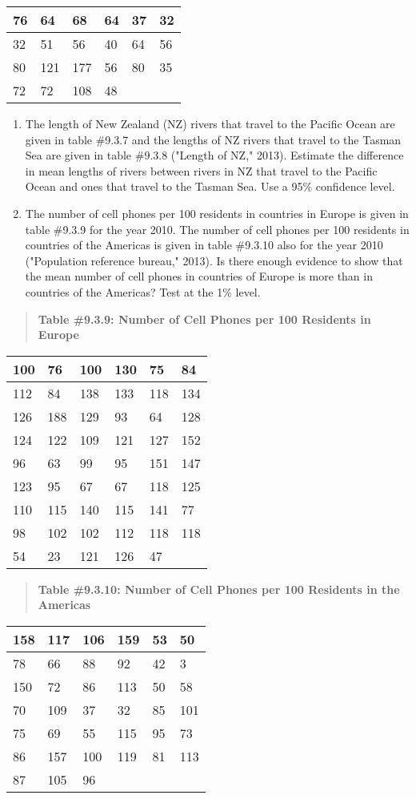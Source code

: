 \documentclass[]{book}
\begin{document}
\begin{longtable}[]{@{}llllll@{}}
\toprule
76 & 64 & 68 & 64 & 37 & 32\tabularnewline
\midrule
\endhead
32 & 51 & 56 & 40 & 64 & 56\tabularnewline
80 & 121 & 177 & 56 & 80 & 35\tabularnewline
72 & 72 & 108 & 48 & &\tabularnewline
\bottomrule
\end{longtable}

\begin{enumerate}
\def\labelenumi{\arabic{enumi}.}
\setcounter{enumi}{5}
\item
  The length of New Zealand (NZ) rivers that travel to the Pacific Ocean are given in table \#9.3.7 and the lengths of NZ rivers that travel to the Tasman Sea are given in table \#9.3.8 ("Length of NZ," 2013). Estimate the difference in mean lengths of rivers between rivers in NZ that travel to the Pacific Ocean and ones that travel to the Tasman Sea. Use a 95\% confidence level.
\item
  The number of cell phones per 100 residents in countries in Europe is given in table \#9.3.9 for the year 2010. The number of cell phones per 100 residents in countries of the Americas is given in table \#9.3.10 also for the year 2010 ("Population reference bureau," 2013). Is there enough evidence to show that the mean number of cell phones in countries of Europe is more than in countries of the Americas? Test at the 1\% level.
\end{enumerate}

\begin{quote}
\textbf{Table \#9.3.9: Number of Cell Phones per 100 Residents in Europe}
\end{quote}

\begin{longtable}[]{@{}llllll@{}}
\toprule
100 & 76 & 100 & 130 & 75 & 84\tabularnewline
\midrule
\endhead
112 & 84 & 138 & 133 & 118 & 134\tabularnewline
126 & 188 & 129 & 93 & 64 & 128\tabularnewline
124 & 122 & 109 & 121 & 127 & 152\tabularnewline
96 & 63 & 99 & 95 & 151 & 147\tabularnewline
123 & 95 & 67 & 67 & 118 & 125\tabularnewline
110 & 115 & 140 & 115 & 141 & 77\tabularnewline
98 & 102 & 102 & 112 & 118 & 118\tabularnewline
54 & 23 & 121 & 126 & 47 &\tabularnewline
\bottomrule
\end{longtable}

\begin{quote}
\textbf{Table \#9.3.10: Number of Cell Phones per 100 Residents in the
Americas}
\end{quote}

\begin{longtable}[]{@{}llllll@{}}
\toprule
158 & 117 & 106 & 159 & 53 & 50\tabularnewline
\midrule
\endhead
78 & 66 & 88 & 92 & 42 & 3\tabularnewline
150 & 72 & 86 & 113 & 50 & 58\tabularnewline
70 & 109 & 37 & 32 & 85 & 101\tabularnewline
75 & 69 & 55 & 115 & 95 & 73\tabularnewline
86 & 157 & 100 & 119 & 81 & 113\tabularnewline
87 & 105 & 96 & & &\tabularnewline
\bottomrule
\end{longtable}
\end{document}

